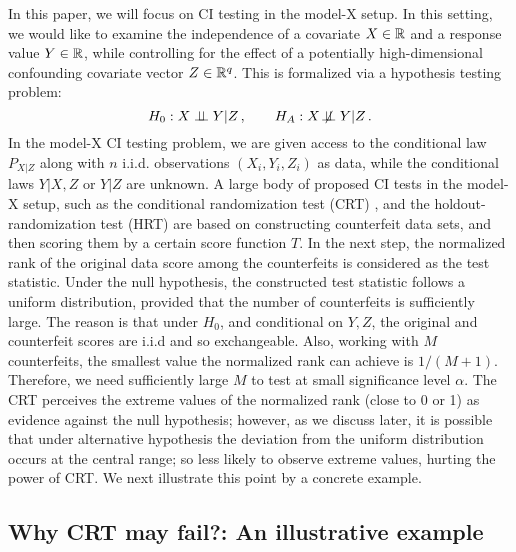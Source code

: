\documentclass[11pt]{article}
\newcommand{\indep}{\perp \!\!\! \perp}
\newcommand{\notindep} {\not\!\perp\!\!\!\perp}
\begin{document}
In this paper, we will focus on CI testing in the model-X setup. In this setting, we would like to examine the independence of a covariate $X\in {\mathbb R}$ and a response value $Y\in {\mathbb R}$,  while controlling for the effect of a potentially high-dimensional confounding covariate vector  $Z\in {\mathbb R}^q$. This is formalized via a hypothesis testing problem:
\begin{equation}\label{eq: CI hypothesis}
 H_0: X\indep Y|Z\,,\quad\quad H_A: X\notindep Y|Z\,.
\end{equation}
In the model-X CI testing problem, we are given access to the conditional law $P_{X|Z}$  along with $n$ i.i.d. observations $(X_i,Y_i,Z_i)$ as data, while the conditional laws $Y|X,Z$ or $Y|Z$ are unknown.  A large body of proposed CI tests in the model-X setup, such as the conditional randomization test (CRT) \cite{candes2018panning},  and the holdout-randomization test (HRT) \cite{tansey2018holdout} are based on constructing counterfeit data sets, and then scoring them by a certain score function $T$. In the next step, the normalized rank of the original data score among the counterfeits is considered as the test statistic.  Under the null hypothesis, the constructed test statistic follows a uniform distribution, provided that the number of counterfeits is sufficiently large. The reason is that under $H_0$, and conditional on $Y, Z$, the original and counterfeit scores are i.i.d and so exchangeable. Also, working with $M$ counterfeits, the smallest value the normalized rank can achieve is $1/(M+1)$. Therefore, we need sufficiently large $M$ to test at small significance level $\alpha$. 
The CRT perceives the extreme values of the normalized rank (close to 0 or 1) as evidence against the null hypothesis; however, as we discuss later, it is possible that under alternative hypothesis the deviation from the uniform distribution occurs at the central range; so less likely to observe extreme values, hurting the power of CRT.  We next illustrate this point by a concrete example.

\subsection{Why CRT may fail?: An illustrative example  }\label{subsec: CRT fails}
\end{document}
